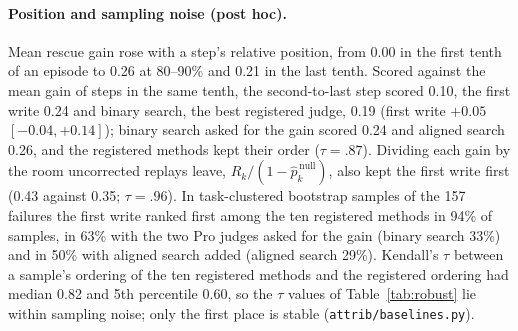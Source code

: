 \documentclass[11pt]{article}
\newcommand{\Rhat}{R(\hat{k})}
\begin{document}
\begin{table}[t]
\centering
\footnotesize
\setlength{\tabcolsep}{2.5pt}
\caption{Mean $\Rhat$ on the 157 rescuable failures under the registered oracle (grading) and under the same oracle without the grading (none), scored at the same named steps (post hoc). Lower block: the post hoc variants of Table~\ref{tab:main}.}
\label{tab:blind}
\end{table}

\paragraph{Position and sampling noise (post hoc).} Mean rescue gain rose with a step's relative position, from 0.00 in the first tenth of an episode to 0.26 at 80--90\% and 0.21 in the last tenth. Scored against the mean gain of steps in the same tenth, the second-to-last step scored 0.10, the first write 0.24 and binary search, the best registered judge, 0.19 (first write $+0.05$ $[-0.04,+0.14]$); binary search asked for the gain scored 0.24 and aligned search 0.26, and the registered methods kept their order ($\tau=.87$). Dividing each gain by the room uncorrected replays leave, $R_k/(1-\hat{p}^{\,\mathrm{null}}_k)$, also kept the first write first (0.43 against 0.35; $\tau=.96$). In task-clustered bootstrap samples of the 157 failures the first write ranked first among the ten registered methods in 94\% of samples, in 63\% with the two Pro judges asked for the gain (binary search 33\%) and in 50\% with aligned search added (aligned search 29\%). Kendall's $\tau$ between a sample's ordering of the ten registered methods and the registered ordering had median 0.82 and 5th percentile 0.60, so the $\tau$ values of Table~\ref{tab:robust} lie within sampling noise; only the first place is stable (\texttt{attrib/baselines.py}).
\end{document}
